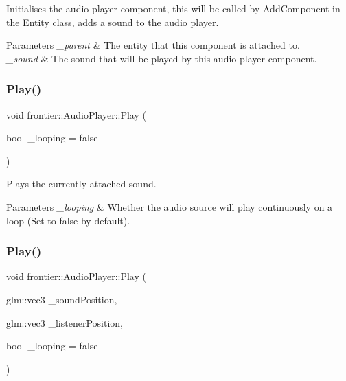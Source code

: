 Initialises the audio player component, this will be called by Add\+Component in the \hyperlink{classfrontier_1_1_entity}{Entity} class, adds a sound to the audio player. 


\begin{DoxyParams}{Parameters}
{\em \+\_\+parent} & The entity that this component is attached to. \\
\hline
{\em \+\_\+sound} & The sound that will be played by this audio player component. \\
\hline
\end{DoxyParams}
\mbox{\label{classfrontier_1_1_audio_player_ad5791ca0776113116a815f86bd630ad7}} 
\subsubsection{\texorpdfstring{Play()}{Play()}\hspace{0.1cm}{\footnotesize\ttfamily [1/2]}}
{\footnotesize\ttfamily void frontier\+::\+Audio\+Player\+::\+Play (\begin{DoxyParamCaption}\item[{bool}]{\+\_\+looping = {\ttfamily false} }\end{DoxyParamCaption})}



Plays the currently attached sound. 


\begin{DoxyParams}{Parameters}
{\em \+\_\+looping} & Whether the audio source will play continuously on a loop (Set to false by default). \\
\hline
\end{DoxyParams}
\mbox{\label{classfrontier_1_1_audio_player_a757be1bd81df8c3885b03177946b38d1}} 
\subsubsection{\texorpdfstring{Play()}{Play()}\hspace{0.1cm}{\footnotesize\ttfamily [2/2]}}
{\footnotesize\ttfamily void frontier\+::\+Audio\+Player\+::\+Play (\begin{DoxyParamCaption}\item[{glm\+::vec3}]{\+\_\+sound\+Position,  }\item[{glm\+::vec3}]{\+\_\+listener\+Position,  }\item[{bool}]{\+\_\+looping = {\ttfamily false} }\end{DoxyParamCaption})}



